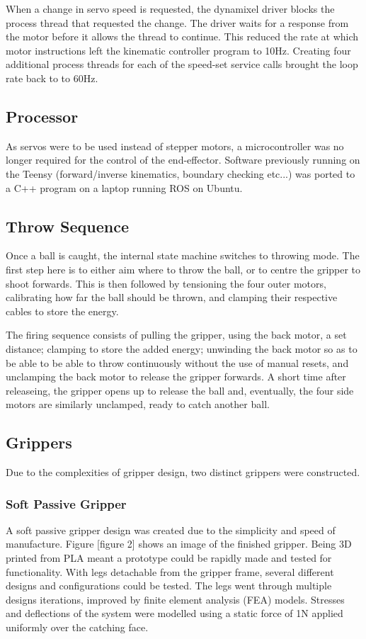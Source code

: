 \documentclass[conference]{IEEEtran}
\begin{document}
		When a change in servo speed is requested, the dynamixel driver blocks the process thread that requested the change. The driver waits for a response from the motor before it allows the thread to continue. This reduced the rate at which motor instructions left the kinematic controller program to 10Hz. Creating four additional process threads for each of the speed-set service calls brought the loop rate back to to 60Hz.
		
		\subsection{Processor}
		As servos were to be used instead of stepper motors, a microcontroller was no longer required for the control of the end-effector. Software previously running on the Teensy (forward/inverse kinematics, boundary checking etc...) was ported to a C++ program on a laptop running ROS on Ubuntu. 

\subsection{Throw Sequence}
Once a ball is caught, the internal state machine switches to throwing mode. The first step here is to either aim where to throw the ball, or to centre the gripper to shoot forwards. This is then followed by tensioning the four outer motors, calibrating how far the ball should be thrown, and clamping their respective cables to store the energy.

The firing sequence consists of pulling the gripper, using the back motor, a set distance; clamping to store the added energy; unwinding the back motor so as to be able to be able to throw continuously without the use of manual resets, and unclamping the back motor to release the gripper forwards. A short time after releaseing, the gripper opens up to release the ball and, eventually, the four side motors are similarly unclamped, ready to catch another ball.

	\subsection{Grippers}
	Due to the complexities of gripper design, two distinct grippers were constructed.
	\subsubsection{Soft Passive Gripper}
	A soft passive gripper design was created due to the simplicity and speed of manufacture. Figure [figure 2] shows an image of the finished gripper.
	Being 3D printed from PLA meant a prototype could be rapidly made and tested for functionality. With legs detachable from the gripper frame, several different designs and configurations could be tested. The legs went through multiple designs iterations, improved by finite element analysis (FEA) models. Stresses and deflections of the system were modelled using a static force of 1N applied uniformly over the catching face.
	
\end{document}
